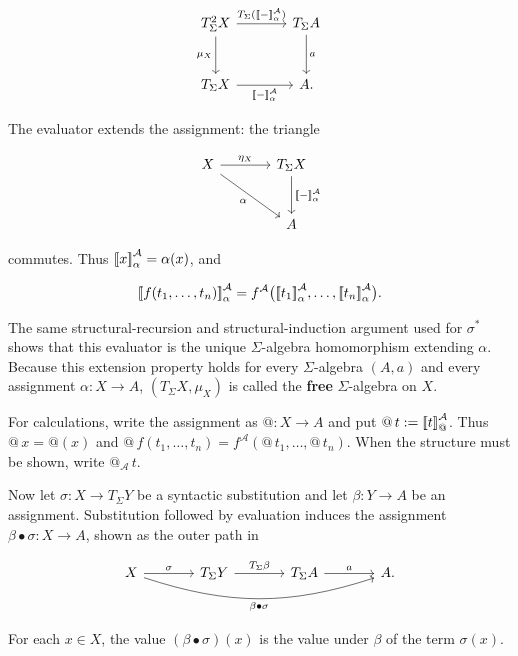 \documentclass[11pt]{article}
\makeatletter
\newcommand{\llbracket}{\mathopen{[\mkern-3mu[}}
\newcommand{\rrbracket}{\mathclose{]\mkern-3mu]}}
\newcommand{\atsign}{\mathord{@}}
\makeatother
\begin{document}
\[
\begin{tikzcd}[row sep=large,column sep=large]
T_\Sigma^2X
  \arrow[r,"T_\Sigma(\llbracket-\rrbracket^{\mathcal A}_\alpha)"]
  \arrow[d,"\mu_X"'] &
T_\Sigma A \arrow[d,"a"] \\
T_\Sigma X
  \arrow[r,"\llbracket-\rrbracket^{\mathcal A}_\alpha"'] & A.
\end{tikzcd}
\]

The evaluator extends the assignment: the triangle

\[
\begin{tikzcd}[row sep=large,column sep=large]
X \arrow[r,"\eta_X"] \arrow[dr,"\alpha"'] &
T_\Sigma X \arrow[d,"\llbracket-\rrbracket^{\mathcal A}_\alpha"] \\
& A
\end{tikzcd}
\]

commutes. Thus \(\llbracket x\rrbracket^{\mathcal A}_\alpha=\alpha(x)\), and

\[
\llbracket f(t_1,\ldots,t_n)\rrbracket^{\mathcal A}_\alpha
=
f^{\mathcal A}
\bigl(
\llbracket t_1\rrbracket^{\mathcal A}_\alpha,
\ldots,
\llbracket t_n\rrbracket^{\mathcal A}_\alpha
\bigr).
\]

The same structural-recursion and structural-induction argument used for
\(\sigma^*\) shows that this evaluator is the unique
\(\Sigma\)-algebra homomorphism extending \(\alpha\).
Because this extension property holds for every \(\Sigma\)-algebra
\((A,a)\) and every assignment \(\alpha:X\to A\),
\((T_\Sigma X,\mu_X)\) is called the \textbf{free} \(\Sigma\)-algebra on
\(X\).

For calculations, write the assignment as \(\atsign:X\to A\) and put
\(\atsign\,t:=\llbracket t\rrbracket^{\mathcal A}_{\atsign}\). Thus
\(\atsign\,x=\atsign(x)\) and
\(\atsign\,f(t_1,\ldots,t_n)=
f^{\mathcal A}(\atsign\,t_1,\ldots,\atsign\,t_n)\). When the structure must
be shown, write \(\atsign_{\mathcal A}\,t\).

Now let \(\sigma:X\to T_\Sigma Y\) be a syntactic substitution and let
\(\beta:Y\to A\) be an assignment. Substitution followed by evaluation
induces the assignment \(\beta\bullet\sigma:X\to A\), shown as the outer
path in

\[
\begin{tikzcd}[column sep=large]
X \arrow[r,"\sigma"]
  \arrow[rrr,bend right=18,"\beta\mathbin\bullet\sigma"'] &
T_\Sigma Y \arrow[r,"T_\Sigma\beta"] &
T_\Sigma A \arrow[r,"a"] & A.
\end{tikzcd}
\]

For each \(x\in X\), the value \((\beta\bullet\sigma)(x)\) is the value
under \(\beta\) of the term \(\sigma(x)\).
\end{document}
